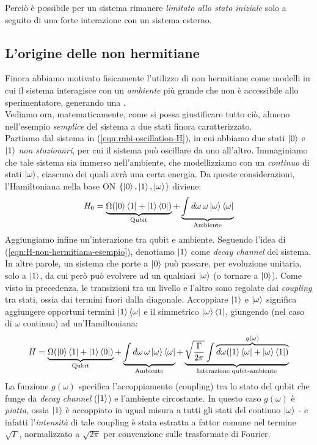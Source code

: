 \documentclass[../../InformazioneQuantistica.tex]{subfiles}
\begin{document}
Perciò è possibile per un sistema rimanere \textit{limitato allo stato iniziale} solo a seguito di una forte interazione con un sistema esterno.

\subsection{L'origine delle  non hermitiane}
Finora abbiamo motivato fisicamente l'utilizzo di  non hermitiane come modelli in cui il sistema interagisce con un \textit{ambiente} più grande che non è accessibile allo sperimentatore, generando una .\\
Vediamo ora, matematicamente, come si possa giustificare tutto ciò, almeno nell'esempio \textit{semplice} del sistema a due stati finora caratterizzato.\\

Partiamo dal sistema in (\ref{eqn:rabi-oscillation-H}), in cui abbiamo due stati $\Ket{0}$ e $\Ket{1}$ \textit{non stazionari}, per cui il sistema può oscillare da uno all'altro. Immaginiamo che tale sistema sia immerso nell'ambiente, che modellizziamo con un \textit{continuo} di stati $\Ket{\omega}$, ciascuno dei quali avrà una certa energia. Da queste considerazioni, l'Hamiltoniana nella base ON $\{\Ket{0}, \Ket{1},\Ket{\omega}\}$ diviene:
\begin{align*}
H_0=\underbrace{\Omega (\Ket{0}\Bra{1} + \Ket{1}\Bra{0})}_{\text{Qubit}} +\underbrace{\int d\omega\, \omega \Ket{\omega}\Bra{\omega}}_{\text{Ambiente}}
\end{align*}
Aggiungiamo infine un'interazione tra qubit e ambiente. Seguendo l'idea di (\ref{eqn:H-non-hermitiana-esempio}), denotiamo $\Ket{1}$ come \textit{decay channel} del sistema. In altre parole, un sistema che parte a $\Ket{0}$ può passare, per evoluzione unitaria, solo a $\Ket{1}$, da cui però può evolvere ad un qualsiasi $\Ket{\omega}$ (o tornare a $\Ket{0}$). Come visto in precedenza, le transizioni tra un livello e l'altro sono regolate dai \textit{coupling} tra stati, ossia dai termini fuori dalla diagonale. Accoppiare $\Ket{1}$ e $\Ket{\omega}$ significa aggiungere opportuni termini $\Ket{1}\Bra{\omega}$ e il simmetrico $\Ket{\omega}\Bra{1}$, giungendo (nel caso di $\omega$ continuo) ad un'Hamiltoniana:
\begin{align}
H=\underbrace{\Omega (\Ket{0}\Bra{1} + \Ket{1}\Bra{0})}_{\text{Qubit}} +\underbrace{\int d\omega\, \omega \Ket{\omega}\Bra{\omega}}_{\text{Ambiente}} +\underbrace{ \sqrt{\frac{\Gamma}{2\pi}}\int \overbrace{d\omega (\Ket{1}\Bra{\omega}+ \Ket{\omega}\Bra{1})}^{g(\omega)}}_{\text{Interazione qubit-ambiente}}
\label{eqn:hamiltoniana-interagente-totale}
\end{align}
La funzione $g(\omega)$ specifica l'accoppiamento (coupling) tra lo stato del qubit che funge da \textit{decay channel} ($\Ket{1}$) e l'ambiente circostante. In questo caso $g(\omega)$ è \textit{piatta}, ossia $\Ket{1}$ è accoppiato in ugual misura a tutti gli stati del continuo $\Ket{\omega}$ - e infatti l'\textit{intensità} di tale coupling è stata estratta a fattor comune nel termine $\sqrt{\Gamma}$, normalizzato a $\sqrt{2\pi}$ per convenzione sulle trasformate di Fourier.
\end{document}
